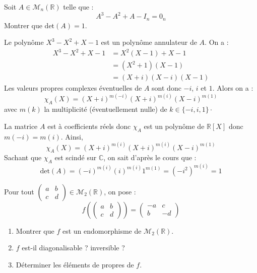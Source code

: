 \documentclass[a4paper,10pt]{report}
\begin{document}
\begin{Exercice}{} Soit $A \in \mathcal{M}_{n}(\mathbb{R})$ telle que :
  \[
  A^{3} - A^{2} + A - I_n = 0_n
  \]
Montrer que $\textrm{det}(A) = 1$.
\end{Exercice}

\corr Le polynôme $X^3-X^2+X-1$ est un polynôme annulateur de $A$. On a :
\begin{align*}
X^3-X^2+X-1 & = X^2(X-1)+X-1 \\
& = (X^2+1)(X-1) \\
& = (X+i)(X-i)(X-1)
\end{align*}
Les valeurs propres complexes éventuelles de $A$ sont donc $-i$, $i$ et $1$. Alors on a :
$$ \chi_A(X)= (X+i)^{m(-i)} (X+i)^{m(i)} (X-i)^{m(1)}$$
avec $m(k)$ la multiplicité (éventuellement nulle) de $k \in \lbrace -i, i ,1 \rbrace \cdot$

\medskip

\noindent La matrice $A$ est à coefficients réels donc $\chi_A$ est un polynôme de $\mathbb{R}[X]$ donc $m(-i)=m(i)$. Ainsi,
$$ \chi_A(X) = (X+i)^{m(i)} (X+i)^{m(i)} (X-i)^{m(1)}$$
Sachant que $\chi_A$ est scindé sur $\mathbb{C}$, on sait d'après le cours que :
$$ \textrm{det}(A) = (-i)^{m(i)} (i)^{m(i)} 1^{m(1)} = (-i^2)^{m(i)} = 1$$


\begin{Exercice}{} Pour tout $\begin{pmatrix}
a & b \\
c & d 
\end{pmatrix} \in \mathcal{M}_2(\mathbb{R})$, on pose :
$$ f \left( \begin{pmatrix}
a & b \\
c & d 
\end{pmatrix} \right) = \begin{pmatrix}
-a & c \\
b & -d 
\end{pmatrix}$$

\begin{enumerate}
\item Montrer que $f$ est un endomorphisme de $\mathcal{M}_2(\mathbb{R})$.
\item $f$ est-il diagonalisable ? inversible ?
\item Déterminer les éléments de propres de $f$.
\end{enumerate}
\end{Exercice}

\corr 
\end{document}
